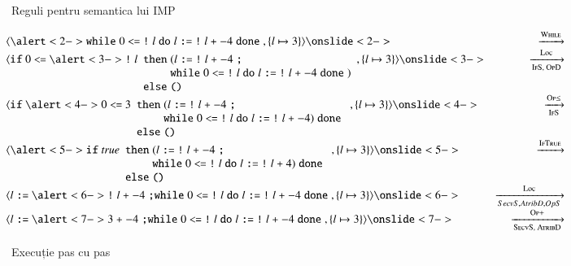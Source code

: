 \documentclass[xcolor=pdftex,romanian,colorlinks]{beamer}
\begin{document}
\begin{section}{Reguli pentru semantica lui IMP}
\begin{frame}
{\small
$\hspace{-1em}\begin{array}{lr}
\c{\alert<2->{\Swhile 0 \terminal{<=} {\terminal{!} l}\Sdo l \terminal{:=} {\terminal{!} l} \terminal{+} -4 } \Sdone{},\{l \mapsto 3\}}
\onslide<2->&\xrightarrow{\textsc{While}}\\
\c{\Sif 0 \terminal{<=} \alert<3->{\terminal{!} l}\begin{array}[t]{l@{\;}l} \Sthen& (l \terminal{:=} {\terminal{!} l} \terminal{+} -4 \terminal{;} \\& \Swhile 0 \terminal{<=} {\terminal{!} l}\Sdo l \terminal{:=} {\terminal{!} l} \terminal{+} -4  \Sdone{}) \\ \Selse &  \Sskip\end{array},\{l \mapsto 3\}}
\onslide<3->
&\xrightarrow[\textsc{IfS, OpD}]{\textsc{Loc}}\\
\c{\Sif \alert<4->{0 \terminal{<=} 3}\begin{array}[t]{l@{\;}l} \Sthen& (l \terminal{:=} {\terminal{!} l} \terminal{+}  -4 \terminal{;} \\& \Swhile 0 \terminal{<=}  {\terminal{!} l}\Sdo l \terminal{:=} {\terminal{!} l} \terminal{+} -4)   \Sdone{}\\ \Selse &\Sskip\end{array},\{l \mapsto 3\}}
\onslide<4->
&\xrightarrow[{\textsc{IfS}}]{\textsc{Op$\leq$}}\\
\c{\alert<5->{\Sif  {\Strue} \begin{array}[t]{l@{\;}l} \Sthen&  (l \terminal{:=} {\terminal{!}l} \terminal{+} -4 \terminal{;} \\ & \Swhile 0 \terminal{<=} {\terminal{!} l}\Sdo l \terminal{:=}  {\terminal{!} l} \terminal{+} 4)  \Sdone{}\\ \Selse & \Sskip\end{array}},\{l \mapsto 3\}}
\onslide<5->
&\xrightarrow{\textsc{IfTrue}}\\
\c{ l \terminal{:=} \alert<6->{ {\terminal{!} l}} \terminal{+} -4 \terminal{;} \Swhile 0 \terminal{<=}  {\terminal{!} l} \Sdo l \terminal{:=}  {\terminal{!} l} \terminal{+} -4   \Sdone{},\{l \mapsto 3\}}
\onslide<6->
&\xrightarrow[SecvS,AtribD,OpS]{\textsc{Loc}}\\
\c{l \terminal{:=} \alert<7->{3 \terminal{+} -4} \terminal{;}  \Swhile 0 \terminal{<=}  {\terminal{!} l}\Sdo  l \terminal{:=}  {\terminal{!} l} \terminal{+} -4   \Sdone{},\{l \mapsto 3\}}
\onslide<7->
&\xrightarrow[\textsc{SecvS, AtribD}]{\textsc{Op+}}\\
\end{array}$}
\end{frame}
\begin{frame}{Execuție pas cu pas}{}


\end{frame}
\end{section}
\end{document}
